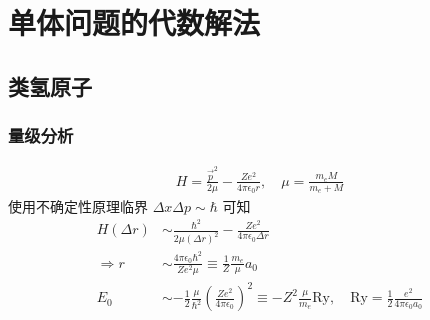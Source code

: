 \documentclass[../../main.tex]{subfiles}
\begin{document}
\section{单体问题的代数解法}

\subsection{类氢原子}
\subsubsection{量级分析}
\begin{align*}
    H = \frac{\vec{p}^{2}}{2\mu} - \frac{Ze^{2}}{4\pi\epsilon_{0}r},\quad \mu = \frac{m_{e}M}{m_{e}+M}
\end{align*}
使用不确定性原理临界 $\Delta x\Delta p\sim\hbar$ 可知
\begin{align*}
    H(\Delta r)&\sim\frac{\hbar^{2}}{2\mu(\Delta r)^{2}} - \frac{Ze^{2}}{4\pi\epsilon_{0}\Delta r}\\
    \Rightarrow r&\sim \frac{4\pi\epsilon_{0}\hbar^{2}}{Ze^{2}\mu} \equiv \frac{1}{Z}\frac{m_{e}}{\mu}a_{0}\\
    E_{0}&\sim -\frac{1}{2}\frac{\mu}{\hbar^{2}}\left(\frac{Ze^{2}}{4\pi\epsilon_{0}}\right)^{2} \equiv -Z^{2}\frac{\mu}{m_{e}}\text{Ry},\quad \text{Ry} = \frac{1}{2}\frac{e^{2}}{4\pi\epsilon_{0}a_{0}}
\end{align*}
\end{document}
